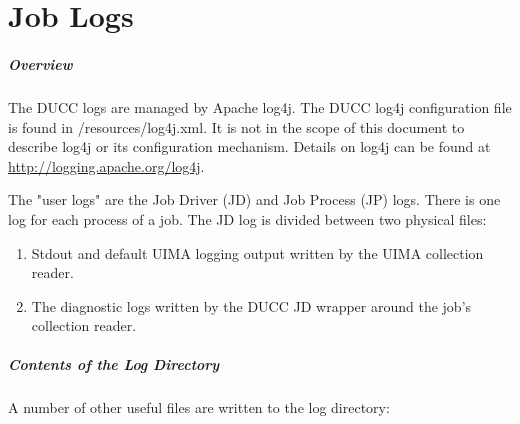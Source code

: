 % 
% 
% 
% 
\ifpdf
\else
{}
\fi
\chapter{Job Logs}
\label{chap:job-logs}

\begin{sloppypar}
\paragraph{Overview}The DUCC logs are managed by Apache log4j.  The DUCC log4j configuration file is found in
\duccruntime/resources/log4j.xml. It is not in the scope of this document to describe log4j or its
configuration mechanism. Details on log4j can be found at \url{http://logging.apache.org/log4j}.
\end{sloppypar}

The "user logs" are the Job Driver (JD) and Job Process (JP) logs. There is one log for each process 
of a job. The JD log is divided between two physical files: 

\begin{enumerate}
   \item Stdout and default UIMA logging output written by the UIMA collection reader.      
   \item The diagnostic logs written by the DUCC JD wrapper around the job's collection reader. 
\end{enumerate}

\paragraph{Contents of the Log Directory} A number of other useful files are written to the log directory: 

